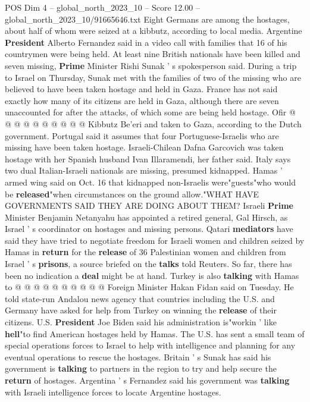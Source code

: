 \begin{textsample}{POS Dim 4 – global\_north\_2023\_10 – Score 12.00 – global\_north\_2023\_10/91665646.txt}
Eight Germans are among the hostages, about half of whom were seized at a kibbutz, according to local media.
Argentine \textbf{President} Alberto Fernandez said in a video call with families that 16 of his countrymen were being held.
At least nine British nationals have been killed and seven missing, \textbf{Prime} Minister Rishi Sunak ' s spokesperson said.
During a trip to Israel on Thursday, Sunak met with the families of two of the missing who are believed to have been taken hostage and held in Gaza.
France has not said exactly how many of its citizens are held in Gaza, although there are seven unaccounted for after the attacks, of which some are being held hostage.
Ofir @ @ @ @ @ @ @ @ @ @ Kibbutz Be'eri and taken to Gaza, according to the Dutch government.
Portugal said it assumes that four Portuguese-Israelis who are missing have been taken hostage.
Israeli-Chilean Dafna Garcovich was taken hostage with her Spanish husband Ivan Illaramendi, her father said.
Italy says two dual Italian-Israeli nationals are missing, presumed kidnapped.
Hamas ' armed wing said on Oct. 16 that kidnapped non-Israelis were"guests"who would be \textbf{released}"when circumstances on the ground allow."WHAT HAVE GOVERNMENTS SAID THEY ARE DOING ABOUT THEM?
Israeli \textbf{Prime} Minister Benjamin Netanyahu has appointed a retired general, Gal Hirsch, as Israel ' s coordinator on hostages and missing persons.
Qatari \textbf{mediators} have said they have tried to negotiate freedom for Israeli women and children seized by Hamas in \textbf{return} for the \textbf{release} of 36 Palestinian women and children from Israel ' s \textbf{prisons}, a source briefed on the \textbf{talks} told Reuters.
So far, there has been no indication a \textbf{deal} might be at hand.
Turkey is also \textbf{talking} with Hamas to @ @ @ @ @ @ @ @ @ @ Foreign Minister Hakan Fidan said on Tuesday.
He told state-run Andalou news agency that countries including the U.S. and Germany have asked for help from Turkey on winning the \textbf{release} of their citizens.
U.S. \textbf{President} Joe Biden said his administration is"workin ' like \textbf{hell}"to find American hostages held by Hamas.
The U.S. has sent a small team of special operations forces to Israel to help with intelligence and planning for any eventual operations to rescue the hostages.
Britain ' s Sunak has said his government is \textbf{talking} to partners in the region to try and help secure the \textbf{return} of hostages.
Argentina ' s Fernandez said his government was \textbf{talking} with Israeli intelligence forces to locate Argentine hostages.

\end{textsample}
